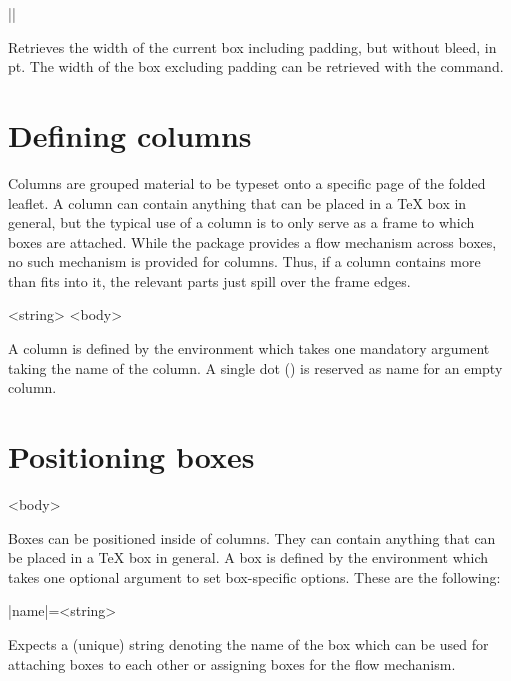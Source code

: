 \documentclass[a4paper]{article}
\begin{document}
\begin{macrodef}
|\leporelloboxwidth|
\end{macrodef}
Retrieves the width of the current box including padding, but without bleed, in pt. The width of the box excluding padding can be retrieved with the \macro{\linewidth} command.

\section{Defining columns}

Columns are grouped material to be typeset onto a specific page of the folded leaflet. A column can contain anything that can be placed in a TeX box in general, but the typical use of a column is to only serve as a frame to which boxes are attached. While the package provides a flow mechanism across boxes, no such mechanism is provided for columns. Thus, if a column contains more than fits into it, the relevant parts just spill over the frame edges.

\begin{macrodef}
\null\begin{|leporellocolumn|}{<string>}
  <body>
\end{|leporellocolumn|}
\end{macrodef}
A column is defined by the  environment which takes one mandatory argument taking the name of the column. A single dot () is reserved as name for an empty column.

\section{Positioning boxes}

\begin{macrodef}
\null\begin{|leporellobox|}[<options>]
  <body>
\end{|leporellobox|}
\end{macrodef}
Boxes can be positioned inside of columns. They can contain anything that can be placed in a TeX box in general. A box is defined by the  environment which takes one optional argument to set box-specific options. These are the following:

\begin{macrodef}
|name|={<string>}
\end{macrodef}
Expects a (unique) string denoting the name of the box which can be used for attaching boxes to each other or assigning boxes for the flow mechanism.
\end{document}
